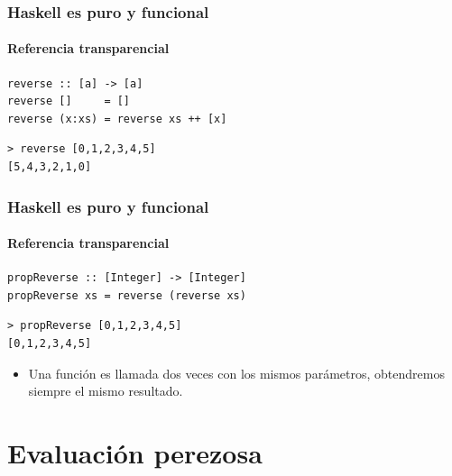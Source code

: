 \documentclass{beamer}
\begin{document}
\begin{frame}[fragile]
  \frametitle{Haskell es puro y funcional}
  \framesubtitle{Referencia transparencial}

\begin{lstlisting}
reverse :: [a] -> [a]
reverse []     = []
reverse (x:xs) = reverse xs ++ [x]
\end{lstlisting}

\vspace{0.3cm}

\begin{lstlisting}[numbers=none, backgroundcolor=\color{lightgray}, keywordstyle=\color{black}]
> reverse [0,1,2,3,4,5]
[5,4,3,2,1,0]
\end{lstlisting}

\end{frame}


\begin{frame}[fragile]
  \frametitle{Haskell es puro y funcional}
  \framesubtitle{Referencia transparencial}

\begin{lstlisting}
propReverse :: [Integer] -> [Integer]
propReverse xs = reverse (reverse xs)
\end{lstlisting}

\vspace{0.3cm}

\begin{lstlisting}[numbers=none, backgroundcolor=\color{lightgray}, keywordstyle=\color{black}]
> propReverse [0,1,2,3,4,5]
[0,1,2,3,4,5]
\end{lstlisting}

\vspace{0.3cm}

\begin{itemize}
\item Una función es llamada dos veces con los mismos parámetros, obtendremos siempre el mismo resultado.\end{itemize}

\end{frame}


\section{Evaluación perezosa}
\end{document}
